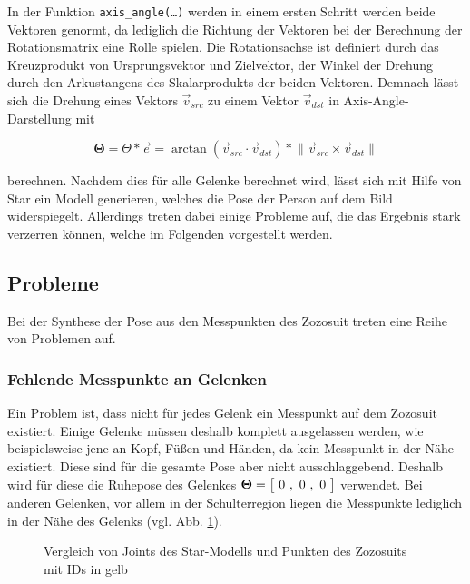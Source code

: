 In der Funktion \texttt{axis\_angle(\dots)} werden in einem ersten Schritt werden beide Vektoren genormt, da lediglich
die Richtung der Vektoren bei der Berechnung der Rotationsmatrix eine Rolle spielen. Die Rotationsachse
ist definiert durch das Kreuzprodukt von Ursprungsvektor und Zielvektor, der Winkel der Drehung durch den
Arkustangens des Skalarprodukts der beiden Vektoren. Demnach lässt sich die Drehung eines Vektors 
$\vec{v}_{src}$ zu einem Vektor $\vec{v}_{dst}$ in Axis-Angle-Darstellung mit

\begin{equation}\label{eq:axis_angle}
  \boldsymbol{\Theta} = \Theta * \vec{e} = \arctan(\vec{v}_{src} \cdot \vec{v}_{dst}) * \lVert \vec{v}_{src} \times \vec{v}_{dst} \rVert
\end{equation}

berechnen. Nachdem dies für alle Gelenke berechnet wird, lässt sich mit Hilfe von Star ein Modell generieren, welches
die Pose der Person auf dem Bild widerspiegelt. Allerdings treten dabei einige Probleme auf, die das Ergebnis
stark verzerren können, welche im Folgenden vorgestellt werden.

\subsection{Probleme}
\label{subsec:probleme}
Bei der Synthese der Pose aus den Messpunkten des Zozosuit treten eine Reihe von Problemen auf.

\subsubsection*{Fehlende Messpunkte an Gelenken}
Ein Problem ist, dass nicht für jedes Gelenk ein Messpunkt auf dem Zozosuit existiert. Einige
Gelenke müssen deshalb komplett ausgelassen werden, wie beispielsweise jene an Kopf, Füßen und Händen, da kein Messpunkt in der
Nähe existiert. Diese sind für die gesamte Pose aber nicht ausschlaggebend. Deshalb wird für diese die Ruhepose des Gelenkes
$\boldsymbol{\Theta}=\irow{0 \ , \ 0 \ ,\ 0}$ verwendet. Bei anderen Gelenken, vor allem in der Schulterregion liegen die Messpunkte
lediglich in der Nähe des Gelenks (vgl. Abb. \ref{fig:schulter}).

\begin{figure}[H]
  \centering 
   \qquad 
  \caption{Vergleich von Joints des Star-Modells und Punkten des Zozosuits mit IDs in gelb} 
  \label{fig:schulter}
\end{figure}


